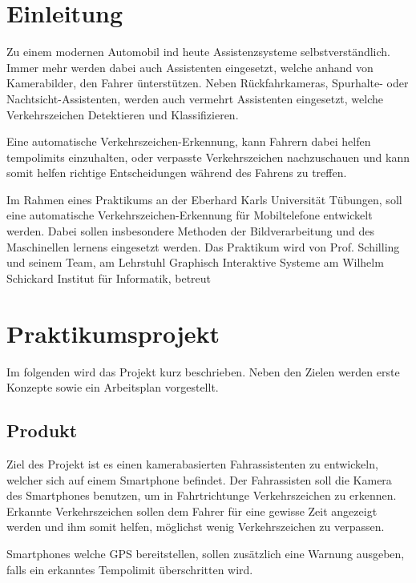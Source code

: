 \section*{Einleitung}
    Zu einem modernen Automobil ind heute Assistenzsysteme selbstverständlich. Immer mehr werden dabei auch Assistenten eingesetzt, welche anhand von Kamerabilder, den Fahrer ünterstützen.
    Neben Rückfahrkameras, Spurhalte- oder Nachtsicht-Assistenten, werden auch vermehrt Assistenten eingesetzt, welche Verkehrszeichen Detektieren und Klassifizieren.

    Eine automatische Verkehrszeichen-Erkennung, kann Fahrern dabei helfen tempolimits einzuhalten, oder verpasste Verkehrszeichen nachzuschauen und kann somit helfen richtige Entscheidungen
    während des Fahrens zu treffen.

    Im Rahmen eines Praktikums an der Eberhard Karls Universität Tübungen, soll eine automatische Verkehrszeichen-Erkennung für Mobiltelefone entwickelt werden. Dabei sollen insbesondere
    Methoden der Bildverarbeitung und des Maschinellen lernens eingesetzt werden. Das Praktikum wird von Prof. Schilling und seinem Team, am Lehrstuhl Graphisch Interaktive Systeme am 
    Wilhelm Schickard Institut für Informatik, betreut
\section*{Praktikumsprojekt}
    Im folgenden wird das Projekt kurz beschrieben. Neben den Zielen werden erste Konzepte sowie ein Arbeitsplan vorgestellt.
\subsection*{Produkt}
    Ziel des Projekt ist es einen kamerabasierten Fahrassistenten zu entwickeln, welcher sich auf einem Smartphone befindet. Der Fahrassisten soll die Kamera des Smartphones benutzen,
    um in Fahrtrichtunge Verkehrszeichen zu erkennen. Erkannte Verkehrszeichen sollen dem Fahrer für eine gewisse Zeit angezeigt werden und ihm somit helfen, möglichst wenig Verkehrszeichen zu
    verpassen.

    Smartphones welche GPS bereitstellen, sollen zusätzlich eine Warnung ausgeben, falls ein erkanntes Tempolimit überschritten wird.
